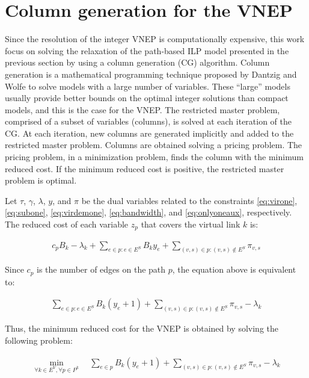 \documentclass{llncs}
\begin{document}
\section{Column generation for the VNEP}
\label{sec:CG}

Since the resolution of the integer VNEP is computationally expensive, 
this work focus on solving the relaxation of the path-based ILP model presented in the previous section by using a column generation (CG) algorithm.
Column generation is a mathematical programming technique proposed by Dantzig and Wolfe \cite{Dantzig:1960} 
to solve models with a large number of variables.
These ``large'' models usually provide better bounds on the optimal integer solutions than compact models, and this is the case for the VNEP.
The restricted master problem, comprised of a subset of variables (columns), is solved at each iteration of the CG.
At each iteration, new columns are generated implicitly and added to the restricted master problem.
Columns are obtained solving a pricing problem.
The pricing problem, in a minimization problem, finds the column with the minimum reduced cost.
If the minimum reduced cost is positive, the restricted master problem is optimal.

Let $\tau$, $\gamma$, $\lambda$, $y$, and  $\pi$ be the dual variables related to the constraints \eqref{eq:virone}, \eqref{eq:subone}, \eqref{eq:virdemone}, \eqref{eq:bandwidth}, and \eqref{eq:onlyoneaux}, respectively. The reduced cost of each variable $z_{p}$ that covers the virtual link $k$ is:

\begin{align}
  c_{p} B_{k} - \lambda_{k} + \sum\limits_{e \in p : e \in E^S} B_{k} y_{e}  + \sum\limits_{(v,s) \in p : (v,s) \notin E^S} \pi_{v,s}  \nonumber
\end{align}

Since $c_p$ is the number of edges on the path $p$, the equation above is equivalent to:

\begin{align}
  \sum\limits_{e \in p : e \in E^S} B_{k} (y_{e} + 1) + \sum\limits_{(v,s) \in p : (v,s) \notin E^S} \pi_{v,s} - \lambda_{k} \nonumber
\end{align}

Thus, the minimum reduced cost for the VNEP is obtained by solving the following problem:

\begin{align}
  \min_{ \forall k \in E^{V}, \forall p \in P^{k}}  \quad  \sum\limits_{e \in p} B_{k} (y_{e} + 1) + \sum\limits_{(v,s) \in p : (v,s) \notin E^S} \pi_{v,s}-\lambda_{k} \nonumber
\end{align}
\end{document}
